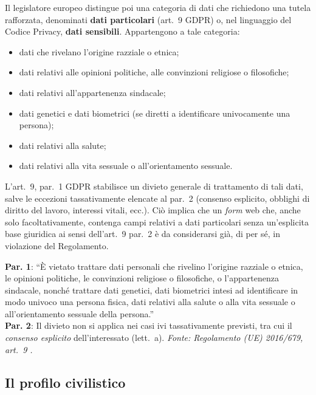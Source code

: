 \documentclass[12pt, a4paper]{article}
\begin{document}
Il legislatore europeo distingue poi una categoria di dati che richiedono una
tutela rafforzata, denominati \textbf{dati particolari} (art.~9 GDPR) o, nel
linguaggio del Codice Privacy, \textbf{dati sensibili}. Appartengono a tale
categoria:

\begin{itemize}[leftmargin=1.5cm]
  \item dati che rivelano l'origine razziale o etnica;
  \item dati relativi alle opinioni politiche, alle convinzioni religiose o filosofiche;
  \item dati relativi all'appartenenza sindacale;
  \item dati genetici e dati biometrici (se diretti a identificare
        univocamente una persona);
  \item dati relativi alla salute;
  \item dati relativi alla vita sessuale o all'orientamento sessuale.
\end{itemize}

L'art.~9, par.~1 GDPR stabilisce un divieto generale di trattamento di tali
dati, salve le eccezioni tassativamente elencate al par.~2 (consenso esplicito,
obblighi di diritto del lavoro, interessi vitali, ecc.). Ciò implica che un
\emph{form} web che, anche solo facoltativamente, contenga campi relativi a
dati particolari senza un'esplicita base giuridica ai sensi dell'art.~9 par.~2 è da
considerarsi già, di per sé, in violazione del Regolamento.

\begin{normabox}
  \small
  \textbf{Par. 1}: ``È vietato trattare dati personali che rivelino l'origine
  razziale o etnica, le opinioni politiche, le convinzioni religiose o filosofiche,
  o l'appartenenza sindacale, nonché trattare dati genetici, dati biometrici intesi
  ad identificare in modo univoco una persona fisica, dati relativi alla salute o
  alla vita sessuale o all'orientamento sessuale della persona.''\\[0.3em]
  \textbf{Par. 2}: Il divieto non si applica nei casi ivi tassativamente previsti,
  tra cui il \emph{consenso esplicito} dell'interessato (lett.~a).
  \newline
  {\scriptsize \textit{Fonte: Regolamento (UE) 2016/679, art.~9 \autocite{gdpr2016}.}}
\end{normabox}

\subsection{Il profilo civilistico}
\label{sub:civile}
\end{document}

